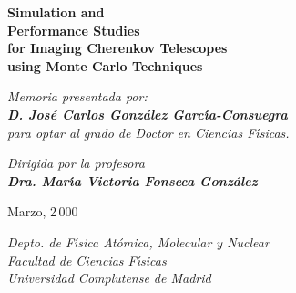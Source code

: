 %



\def\mititulo{%
Simulation and \\%
Performance Studies\\%
for Imaging Cherenkov Telescopes\\%
using Monte Carlo Techniques\\}

\thispagestyle{empty}  

\mbox{}

\vskip 80pt

\begin{center}

{\Huge \sffamily \bfseries \sc \mititulo}

\vskip 80pt

{ \large \it
%
Memoria presentada por:\\
{\bfseries \rm D. Jos{\'{e}} Carlos Gonz{\'{a}}lez Garc{\'{\i}}a-Consuegra}\\
para optar al grado de Doctor en Ciencias F{\'{\i}}sicas.\\
}

\vskip 40pt

{ \large \it 
%
Dirigida por la profesora\\
{\bfseries \rm Dra. Mar{\'{\i}}a Victoria Fonseca Gonz{\'{a}}lez}\\
}

\vskip 40pt

{\rm
%
Marzo, 2\,000 \\
}

\vskip 30pt

{\it \small
Depto. de F{\'{\i}}sica At{\'{o}}mica, Molecular y Nuclear\\
Facultad de Ciencias F{\'{\i}}sicas\\
Universidad Complutense de Madrid\\
} 

\end{center}

